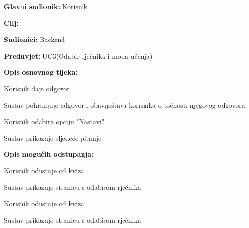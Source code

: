 					\noindent {}
					\begin{packed_item}
						
						\item \textbf{Glavni sudionik: } Korisnik
						\item  \textbf{Cilj:} 
						\item  \textbf{Sudionici:} Backend
						\item  \textbf{Preduvjet:} UC3(Odabir rječnika i moda učenja)
						\item  \textbf{Opis osnovnog tijeka:}
						
						\item[] \begin{packed_enum}
							
							\item Korisnik daje odgovor
							\item Sustav pohranjuje odgovor i obaviještava korisnika o točnosti njegovog odgovora
							\item Korisnik odabire opciju "Nastavi"
							\item Sustav prikazuje sljedeće pitanje
						\end{packed_enum}
						
						\item  \textbf{Opis mogućih odstupanja:}
						
						\item[] \begin{packed_item}
							
							\item[3.a] Korisnik odustaje od kviza
							\item[] \begin{packed_enum}
								
								\item Sustav prikazuje stranicu s odabirom rječnika
								
							\end{packed_enum}
							
							\item[4.a] Korisnik odustaje od kviza 
							\item[] \begin{packed_enum}
								
								\item Sustav prikazuje stranicu s odabirom rječnika
								
							\end{packed_enum}
							
						\end{packed_item}
					\end{packed_item}
					

